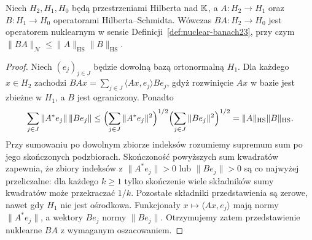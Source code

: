 \begin{lemat}
\label{lem:hs-compose-nuclear23}
Niech $H_2,H_1,H_0$ będą przestrzeniami Hilberta nad $\mathbb K$, a
$A:H_2\to H_1$ oraz $B:H_1\to H_0$ operatorami
Hilberta--Schmidta. Wówczas $BA:H_2\to H_0$ jest
operatorem nuklearnym w sensie
Definicji~\ref{def:nuclear-banach23}, przy czym
$\|BA\|_{\mathcal N}\le\|A\|_{\mathrm{HS}}\|B\|_{\mathrm{HS}}$.
\end{lemat}
\begin{proof}
Niech $(e_j)_{j\in J}$ będzie dowolną bazą ortonormalną $H_1$.
Dla każdego $x\in H_2$ zachodzi
$BAx=\sum_{j\in J}\langle Ax,e_j\rangle Be_j$,
gdyż rozwinięcie $Ax$ w bazie jest zbieżne w $H_1$,
a $B$ jest ograniczony. Ponadto
\[
 \sum_{j\in J}\|A^*e_j\|\,\|Be_j\|
 \le\Bigl(\sum_{j\in J}\|A^*e_j\|^2\Bigr)^{1/2}
     \Bigl(\sum_{j\in J}\|Be_j\|^2\Bigr)^{1/2}
 =\|A\|_{\mathrm{HS}}\|B\|_{\mathrm{HS}}.
\]
Przy sumowaniu po dowolnym zbiorze indeksów rozumiemy supremum
sum po jego skończonych podzbiorach. Skończoność powyższych sum
kwadratów zapewnia, że zbiory indeksów z
$\|A^*e_j\|>0$ lub $\|Be_j\|>0$ są co najwyżej przeliczalne:
dla każdego $k\ge1$ tylko skończenie wiele składników
sumy kwadratów może przekraczać $1/k$.
Pozostałe składniki przedstawienia są zerowe,
nawet gdy $H_1$ nie jest ośrodkowa. Funkcjonały
$x\mapsto\langle Ax,e_j\rangle$ mają normy $\|A^*e_j\|$,
a wektory $Be_j$ normy $\|Be_j\|$. Otrzymujemy zatem
przedstawienie nuklearne $BA$ z wymaganym oszacowaniem.
\end{proof}


